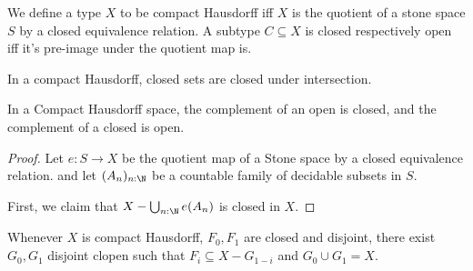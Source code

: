 \begin{definition}
We define a type $X$ to be compact Hausdorff iff 
$X$ is the quotient of a stone space $S$ by a closed equivalence relation. 
%
A subtype $C\subseteq X$ is closed respectively open iff it's pre-image under the quotient map is. 
\end{definition}

\begin{lemma}
  In a compact Hausdorff, closed sets are closed under intersection. 
\end{lemma}









\begin{lemma}
  In a Compact Hausdorff space, the complement of an open is closed, and the complement of a closed is open. 
\end{lemma}
\begin{proof}
  Let $e : S \to X$ be the quotient map of a Stone space by a closed equivalence relation. 
  and let $(A_n)_{n:\N}$ be a countable family of decidable subsets in $S$. 

  First, we claim that 
  $X - \bigcup_{n:\N} e(A_n)$
  is closed in $X$. 
\end{proof}

\begin{lemma}
  Whenever $X$ is compact Hausdorff, $F_0, F_1$ are closed and disjoint, 
  there exist $G_0, G_1$ disjoint clopen such that 
  $F_i \subseteq X - G_{1-i}$ and $G_0 \cup G_1 = X$. 
  
\end{lemma}
